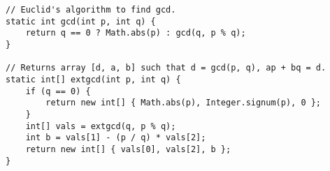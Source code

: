 \begin{verbatim}
// Euclid's algorithm to find gcd.
static int gcd(int p, int q) {
	return q == 0 ? Math.abs(p) : gcd(q, p % q);
}

// Returns array [d, a, b] such that d = gcd(p, q), ap + bq = d.
static int[] extgcd(int p, int q) {
	if (q == 0) {
		return new int[] { Math.abs(p), Integer.signum(p), 0 };
	}
	int[] vals = extgcd(q, p % q);
	int b = vals[1] - (p / q) * vals[2];
	return new int[] { vals[0], vals[2], b };
}
\end{verbatim}